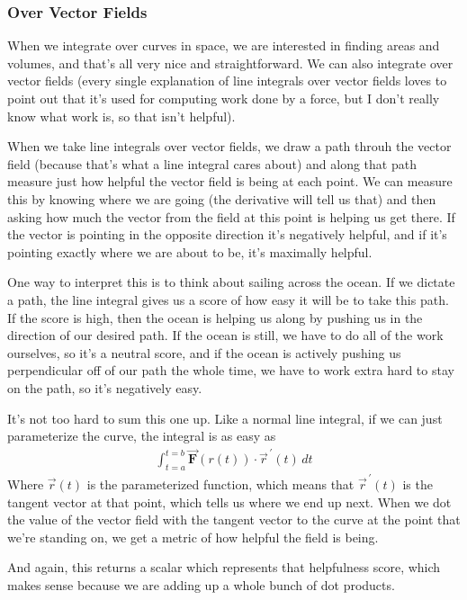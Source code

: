 \documentclass[12pt, letterpaper]{article}
\begin{document}
\subsubsection{Over Vector Fields}
When we integrate over curves in space, we are interested in finding areas and volumes, and that's all very nice and straightforward.
We can also integrate over vector fields (every single explanation of line integrals over vector fields loves to point out that 
it's used for computing work done by a force, but I don't really know what work is, so that isn't helpful).

When we take line integrals over vector fields, we draw a path throuh the vector field (because that's what a line integral cares about)
and along that path measure just how helpful the vector field is being at each point.
We can measure this by knowing where we are going (the derivative will tell us that) and then asking how much the vector from the field at this point is helping us get there.
If the vector is pointing in the opposite direction it's negatively helpful, and if it's pointing exactly where we are about to be, it's maximally helpful.

One way to interpret this is to think about sailing across the ocean.
If we dictate a path, the line integral gives us a score of how easy it will be to take this path.
If the score is high, then the ocean is helping us along by pushing us in the direction of our desired path.
If the ocean is still, we have to do all of the work ourselves, so it's a neutral score,
and if the ocean is actively pushing us perpendicular off of our path the whole time, we have to work extra hard to stay on the path, so it's negatively easy.

It's not too hard to sum this one up.
Like a normal line integral, if we can just parameterize the curve, the integral is as easy as
\begin{gather*}
    \int_{t=a}^{t=b} \vec{\mathbf{F}}(r(t)) \cdot \vec{r}^{\,\prime} (t) \, dt
\end{gather*}
Where $\vec{r}(t)$ is the parameterized function,
which means that $\vec{r}^{\,\prime} (t)$ is the tangent vector at that point, which tells us where we end up next.
When we dot the value of the vector field with the tangent vector to the curve at the point that we're standing on, we get a metric of how helpful the field is being.

And again, this returns a scalar which represents that helpfulness score, which makes sense because we are adding up a whole bunch of dot products.
\end{document}
